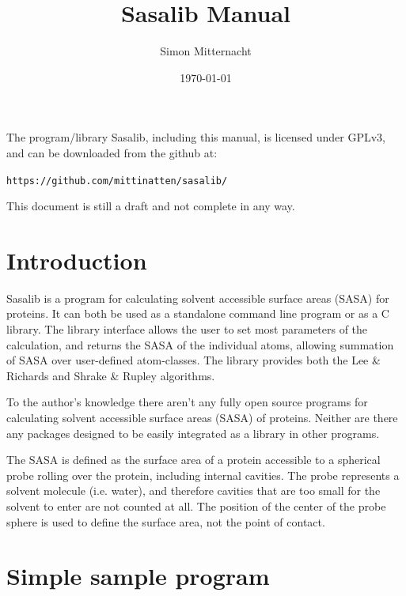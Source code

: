 \documentclass[a4paper,11pt]{article}
\author{Simon Mitternacht}
\date{\today}
\title{Sasalib Manual}
\begin{document}
\maketitle
\noindent
The program/library Sasalib, including this manual, is licensed under
GPLv3, and can be downloaded from the github at: 
\begin{center}
\texttt{https://github.com/mittinatten/sasalib/}
\end{center}

This document is still a draft and not complete in any way.

\newpage
\section{Introduction}

Sasalib is a program for calculating solvent accessible surface areas
(SASA) for proteins. It can both be used as a standalone command line
program or as a C library. The library interface allows the user to
set most parameters of the calculation, and returns the SASA of the
individual atoms, allowing summation of SASA over user-defined
atom-classes. The library provides both the Lee \& Richards
\cite{LnR} and Shrake \& Rupley \cite{SnR} algorithms.

To the author's knowledge there aren't any fully open source programs
for calculating solvent accessible surface areas (SASA) of
proteins. Neither are there any packages designed to be easily
integrated as a library in other programs.

The SASA is defined as the surface area of a protein accessible to a
spherical probe rolling over the protein, including internal
cavities. The probe represents a solvent molecule (i.e. water), and
therefore cavities that are too small for the solvent to enter are not
counted at all. The position of the center of the probe sphere is used
to define the surface area, not the point of contact.

\section{Simple sample program}\label{sec:simple_sample}
\end{document}
